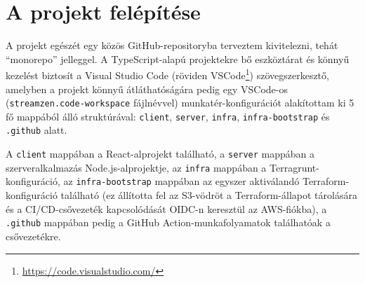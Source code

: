 \section{A projekt felépítése}

A projekt egészét egy közös GitHub-repositoryba terveztem kivitelezni, tehát ``monorepo'' jelleggel. A TypeScript-alapú projektekre bő eszköztárat és könnyű kezelést biztosít a Visual Studio Code (röviden VSCode\footnote{\url{https://code.visualstudio.com/}}) szövegszerkesztő, amelyben a projekt könnyű átláthatóságára pedig egy VSCode-os (\verb|streamzen.code-workspace| fájlnévvel) munkatér-konfigurációt alakítottam ki 5 fő mappából álló struktúrával: \verb|client|, \verb|server|, \verb|infra|, \verb|infra-bootstrap| és \verb|.github| alatt.

A \verb|client| mappában a React-alprojekt található, a \verb|server| mappában a szerveralkalmazás Node.js-alprojektje, az \verb|infra| mappában a Terragrunt-konfiguráció, az \verb|infra-bootstrap| mappában az egyszer aktiválandó Terraform-konfiguráció található (ez állította fel az S3-vödröt a Terraform-állapot tárolására és a CI/CD-csővezeték kapcsolódását OIDC-n keresztül az AWS-fiókba), a \verb|.github| mappában pedig a GitHub Action-munkafolyamatok találhatóak a csővezetékre.
